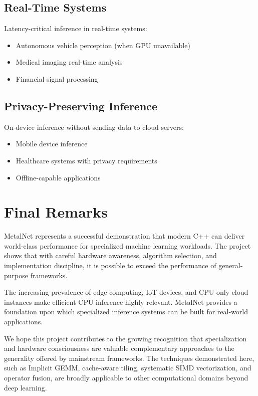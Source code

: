 \documentclass[12pt,oneside,a4paper]{report}
\begin{document}
\subsection{Real-Time Systems}

Latency-critical inference in real-time systems:
\begin{itemize}
    \item Autonomous vehicle perception (when GPU unavailable)
    \item Medical imaging real-time analysis
    \item Financial signal processing
\end{itemize}

\subsection{Privacy-Preserving Inference}

On-device inference without sending data to cloud servers:
\begin{itemize}
    \item Mobile device inference
    \item Healthcare systems with privacy requirements
    \item Offline-capable applications
\end{itemize}

\section{Final Remarks}

MetalNet represents a successful demonstration that modern C++ can deliver world-class performance for specialized machine learning workloads. The project shows that with careful hardware awareness, algorithm selection, and implementation discipline, it is possible to exceed the performance of general-purpose frameworks.

The increasing prevalence of edge computing, IoT devices, and CPU-only cloud instances make efficient CPU inference highly relevant. MetalNet provides a foundation upon which specialized inference systems can be built for real-world applications.

We hope this project contributes to the growing recognition that specialization and hardware consciousness are valuable complementary approaches to the generality offered by mainstream frameworks. The techniques demonstrated here, such as Implicit GEMM, cache-aware tiling, systematic SIMD vectorization, and operator fusion, are broadly applicable to other computational domains beyond deep learning.
\end{document}
